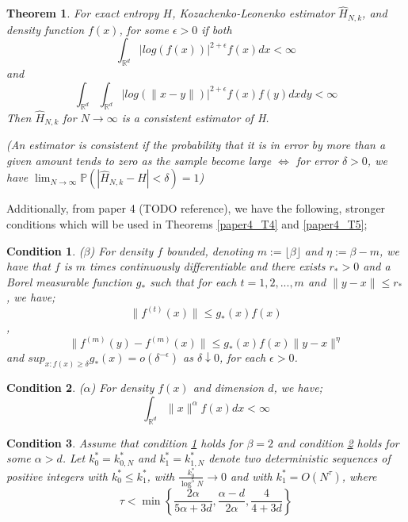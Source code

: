 \documentclass{article}
\newtheorem{theorem}{Theorem}
\newtheorem{remark}{Condition}
\begin{document}
\begin{theorem} \label{paper1_T2}
For exact entropy $H$, Kozachenko-Leonenko estimator $\hat{H}_{N,k}$, and density function $f(x)$, for some $\epsilon > 0$ if both
\begin{equation}
\int_{\mathbb{R}^{d}} | log(f(x))|^{2 + \epsilon} f(x) dx < \infty \nonumber
\end{equation}
and
\begin{equation}
\int_{\mathbb{R}^{d}} \int_{\mathbb{R}^{d}} | log(\|x-y\|)|^{2+ \epsilon} f(x) f(y) dx dy < \infty \nonumber
\end{equation}
Then $\hat{H}_{N, k}$ for $N \to \infty$ is a consistent estimator of H.

(An estimator is consistent if the probability that it is in error by more than a given amount tends to zero as the sample become large $\Leftrightarrow $ for error $\delta > 0$, we have $\lim_{N \to \infty} \mathbb{P}(|\hat{H}_{N,k} - H| < \delta) = 1$) 
\end{theorem}

Additionally, from paper 4 (TODO reference), we have the following, stronger conditions which will be used in Theorems \ref{paper4_T4} and \ref{paper4_T5};
\begin{remark} ($\beta$) \label{A1}
For density $f$ bounded, denoting $m := \lfloor \beta \rfloor$ and $\eta := \beta -m$, we have that $f$ is $m$ times continuously differentiable and there exists $r_{*} > 0$ and a Borel measurable function $g_{*}$ such that for each $t = 1, 2, ... , m$ and $\|y-x\| \leq r_{*}$, we have;
\begin{equation}
\| f^{(t)} (x) \| \leq g_{*}(x)f(x) \nonumber
\end{equation},
\begin{equation}
\| f^{(m)} (y) - f^{(m)} (x) \| \leq g_{*}(x)f(x) \|y-x\|^{\eta} \nonumber
\end{equation}
and $sup_{x:f(x)\geq \delta} g_{*}(x) = o(\delta^{-\epsilon})$ as $\delta \downarrow 0$, for each $\epsilon > 0$.
\end{remark}

\begin{remark} ($\alpha$) \label{A2}
For density $f(x)$ and dimension $d$, we have;
\begin{equation}
\int_{\mathbb{R}^{d}} \| x \|^{\alpha} f(x) dx < \infty \nonumber
\end{equation}
\end{remark}

\begin{remark} \label{A3}
Assume that condition \ref{A1} holds for $\beta = 2$ and condition \ref{A2} holds for some $\alpha > d$. Let $k_{0}^{*} = k_{0, N}^{*}$ and $k_{1}^{*} = k_{1, N}^{*}$ denote two deterministic sequences of positive integers with $k_{0}^{*} \leq k_{1}^{*}$, with $\frac{k_{0}^{*}}{\log^{5}{N}} \to 0$ and with $k_{1}^{*} = O(N^{\tau})$, where
\begin{equation}
\tau < \min \left\{ \frac{2 \alpha}{5 \alpha + 3d} , \frac{\alpha - d}{2 \alpha} , \frac{4}{4 + 3d} \right\} \nonumber
\end{equation}
\end{remark}
\end{document}

